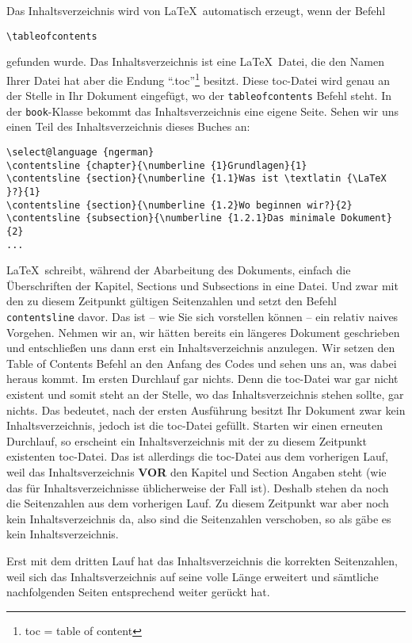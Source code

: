 Das Inhaltsverzeichnis wird von \LaTeX\ automatisch erzeugt, wenn der Befehl 
\begin{verbatim}
\tableofcontents
\end{verbatim}
gefunden wurde. Das Inhaltsverzeichnis ist eine \LaTeX\ Datei, die den Namen Ihrer Datei hat aber die Endung "`.toc"'\footnote{toc = table of content} besitzt. Diese toc-Datei wird genau an der Stelle in Ihr Dokument eingefügt, wo der \texttt{tableofcontents} Befehl steht. In der \texttt{book}-Klasse bekommt das Inhaltsverzeichnis eine eigene Seite. Sehen wir uns einen Teil des Inhaltsverzeichnis dieses Buches an:

\footnotesize
\begin{verbatim}
\select@language {ngerman}
\contentsline {chapter}{\numberline {1}Grundlagen}{1}
\contentsline {section}{\numberline {1.1}Was ist \textlatin {\LaTeX }?}{1}
\contentsline {section}{\numberline {1.2}Wo beginnen wir?}{2}
\contentsline {subsection}{\numberline {1.2.1}Das minimale Dokument}{2}
...
\end{verbatim}
\normalsize

\LaTeX\ schreibt, während der Abarbeitung des Dokuments, einfach die Überschriften der Kapitel, Sections und Subsections in eine Datei. Und zwar mit den zu diesem Zeitpunkt gültigen Seitenzahlen und setzt den Befehl \texttt{contentsline} davor. Das ist -- wie Sie sich vorstellen können -- ein relativ naives Vorgehen. Nehmen wir an, wir hätten bereits ein längeres Dokument geschrieben und entschließen uns dann erst ein Inhaltsverzeichnis anzulegen. Wir setzen den Table of Contents Befehl an den Anfang des Codes und sehen uns an, was dabei heraus kommt. Im ersten Durchlauf gar nichts. Denn die toc-Datei war gar nicht existent und somit steht an der Stelle, wo das Inhaltsverzeichnis stehen sollte, gar nichts. Das bedeutet, nach der ersten Ausführung besitzt Ihr Dokument zwar kein Inhaltsverzeichnis, jedoch ist die toc-Datei gefüllt. Starten wir einen erneuten Durchlauf, so erscheint ein Inhaltsverzeichnis mit der zu diesem Zeitpunkt existenten toc-Datei. Das ist allerdings die toc-Datei aus dem vorherigen Lauf, weil das Inhaltsverzeichnis  \textbf{VOR} den Kapitel und Section Angaben steht (wie das für Inhaltsverzeichnisse üblicherweise der Fall ist). Deshalb stehen da noch die Seitenzahlen aus dem vorherigen Lauf. Zu diesem Zeitpunkt war aber noch kein Inhaltsverzeichnis da, also sind die Seitenzahlen verschoben, so als gäbe es kein Inhaltsverzeichnis.

Erst mit dem dritten Lauf hat das Inhaltsverzeichnis die korrekten Seitenzahlen, weil sich das Inhaltsverzeichnis auf seine volle Länge erweitert und sämtliche nachfolgenden Seiten entsprechend weiter gerückt hat.

